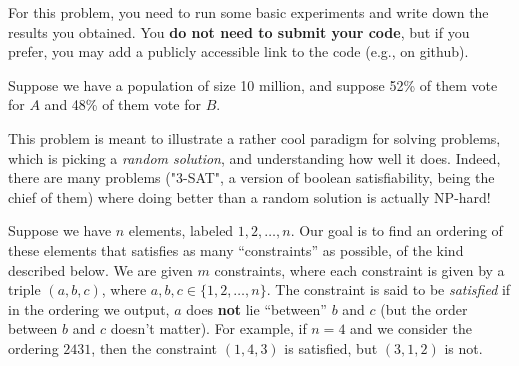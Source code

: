 \documentclass[addpoints, 11pt]{exam}
\begin{document}
\begin{questions}

For this problem, you need to run some basic experiments and write down the results you obtained. You {\bf do not need to submit your code}, but if you prefer, you may add a publicly accessible link to the code (e.g., on github). 

Suppose we have a population of size 10 million, and suppose 52\% of them vote for $A$ and 48\% of them vote for $B$.  


This problem is meant to illustrate a rather cool paradigm for solving problems, which is picking a {\em random solution}, and understanding how well it does. Indeed, there are many problems ("3-SAT", a version of boolean satisfiability, being the chief of them) where doing better than a random solution is actually NP-hard!

Suppose we have $n$ elements, labeled $1, 2, \dots, n$. Our goal is to find an ordering of these elements that satisfies as many ``constraints'' as possible, of the kind described below. We are given $m$ constraints, where each constraint is given by a triple $(a, b, c)$, where $a, b, c \in \{1, 2, \dots, n\}$. The constraint is said to be {\em satisfied} if in the ordering we output, $a$ does {\bf not} lie ``between'' $b$ and $c$ (but the order between $b$ and $c$ doesn't matter).  For example, if $n=4$ and we consider the ordering $2 4 3 1$, then the constraint $(1, 4, 3)$ is satisfied, but $(3, 1, 2)$ is not.


\end{questions}
\end{document}
